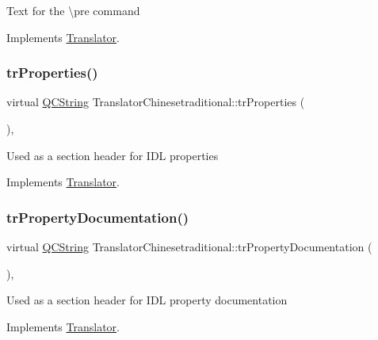 Text for the \textbackslash{}pre command 

Implements \mbox{\hyperlink{class_translator}{Translator}}.

\mbox{\label{class_translator_chinesetraditional_a12d4ce73f80d761d88d4f48502d1deb4}} 
\subsubsection{\texorpdfstring{trProperties()}{trProperties()}}
{\footnotesize\ttfamily virtual \mbox{\hyperlink{class_q_c_string}{Q\+C\+String}} Translator\+Chinesetraditional\+::tr\+Properties (\begin{DoxyParamCaption}{ }\end{DoxyParamCaption})\hspace{0.3cm}{\ttfamily [inline]}, {\ttfamily [virtual]}}

Used as a section header for I\+DL properties 

Implements \mbox{\hyperlink{class_translator}{Translator}}.

\mbox{\label{class_translator_chinesetraditional_a957f249ec35e3e55307591caed7094a6}} 
\subsubsection{\texorpdfstring{trPropertyDocumentation()}{trPropertyDocumentation()}}
{\footnotesize\ttfamily virtual \mbox{\hyperlink{class_q_c_string}{Q\+C\+String}} Translator\+Chinesetraditional\+::tr\+Property\+Documentation (\begin{DoxyParamCaption}{ }\end{DoxyParamCaption})\hspace{0.3cm}{\ttfamily [inline]}, {\ttfamily [virtual]}}

Used as a section header for I\+DL property documentation 

Implements \mbox{\hyperlink{class_translator}{Translator}}.

